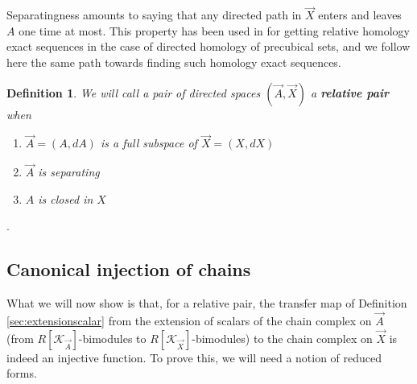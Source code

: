 \documentclass[a4paper,fleqn]{cas-sc}
\newtheorem{dfnt}{Definition}%
\newcommand{\K}{\mathcal{K}}
\begin{document}
Separatingness amounts to saying that any directed path in $\Vec{X}$ enters and leaves $A$ one time at most. This property has been used in \cite{eric} for getting relative homology exact sequences in the case of directed homology of precubical sets, and we follow here the same path towards finding such homology exact sequences. 




\begin{dfnt}
We will call a pair of directed spaces $(\Vec{A}, \Vec{X})$ a \textbf{relative pair} when
\begin{enumerate}
    \item $\Vec{A}=(A,dA)$ is a full subspace of $\Vec{X}=(X,dX)$
    \item $\Vec{A}$ is separating
    \item $A$ is closed in $X$
\end{enumerate}
\end{dfnt}

.

\subsection{Canonical injection of chains}
 What we will now show is that, for a relative pair, the transfer map of Definition \ref{sec:extensionscalar} from the extension of scalars of the chain complex on $\Vec{A}$ (from $R[\K_{\Vec{A}}]$-bimodules to $R[\K_{\Vec{X}}]$-bimodules) to the chain complex on $\Vec{X}$ is indeed an injective function. To prove this, we will need a notion of reduced forms.
\end{document}
